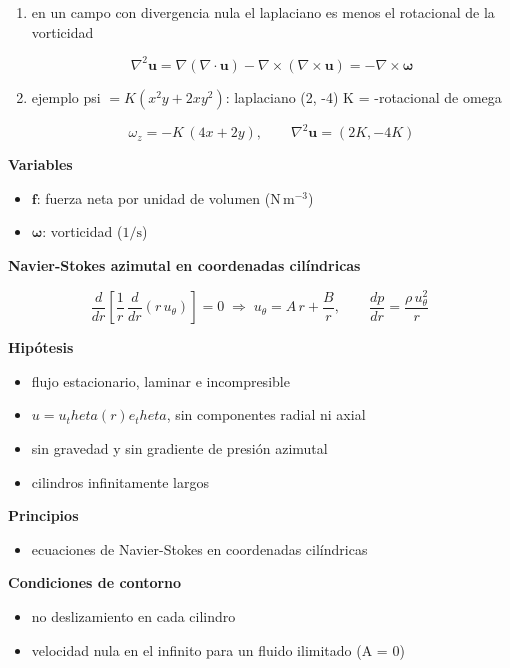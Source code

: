 \documentclass[10pt,openany]{book}
\begin{document}
\begin{tcolorbox}[title={Desarrollos del modelo}, studiumdef, breakable]
\begin{enumerate}
\[
\nabla p = -\rho\,\frac{D\mathbf{u}}{Dt} + \mu\nabla^{2}\mathbf{u}
\]
\item
en un campo con divergencia nula el laplaciano es menos el rotacional de la vorticidad

\[
\nabla^{2}\mathbf{u} = \nabla(\nabla\cdot\mathbf{u}) - \nabla\times(\nabla\times\mathbf{u}) = -\nabla\times\boldsymbol{\omega}
\]
\item
ejemplo psi \(= K(x^2 y + 2 x y^2)\): laplaciano (2, -4) K = -rotacional de omega

\[
\omega_z = -K\,(4x + 2y),\qquad \nabla^{2}\mathbf{u} = (2K, -4K)
\]
\end{enumerate}

\noindent\textbf{Variables}
\begin{itemize}
\item $\mathbf{f}$: fuerza neta por unidad de volumen ($\mathrm{N}\,\mathrm{m}^{-3}$)
\item $\boldsymbol{\omega}$: vorticidad ($\mathrm{1/s}$)
\end{itemize}



\noindent\textbf{Navier-Stokes azimutal en coordenadas cilíndricas}

\begin{equation}
\frac{d}{dr}\!\left[\frac{1}{r}\,\frac{d}{dr}\left(r\,u_\theta\right)\right] = 0 \;\Rightarrow\; u_\theta = A\,r + \frac{B}{r},\qquad \frac{dp}{dr} = \frac{\rho\,u_\theta^{2}}{r}
\label{eq:c14-ns-azimutal}
\end{equation}

\noindent\textbf{Hipótesis}
\begin{itemize}
\item flujo estacionario, laminar e incompresible
\item \(u = u_theta(r) e_theta\), sin componentes radial ni axial
\item sin gravedad y sin gradiente de presión azimutal
\item cilindros infinitamente largos
\end{itemize}

\noindent\textbf{Principios}
\begin{itemize}
\item ecuaciones de Navier-Stokes en coordenadas cilíndricas
\end{itemize}

\noindent\textbf{Condiciones de contorno}
\begin{itemize}
\item no deslizamiento en cada cilindro
\item velocidad nula en el infinito para un fluido ilimitado (A = 0)
\end{itemize}


\end{tcolorbox}
\end{document}
